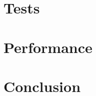 \documentclass[11pt, twocolumn]{article}
\begin{document}
\section{Tests}


\section{Performance}


\section{Conclusion}


\newpage
\clearpage %
{}


\newpage
\appendix
\begin{appendices}
\end{appendices}
\end{document}
